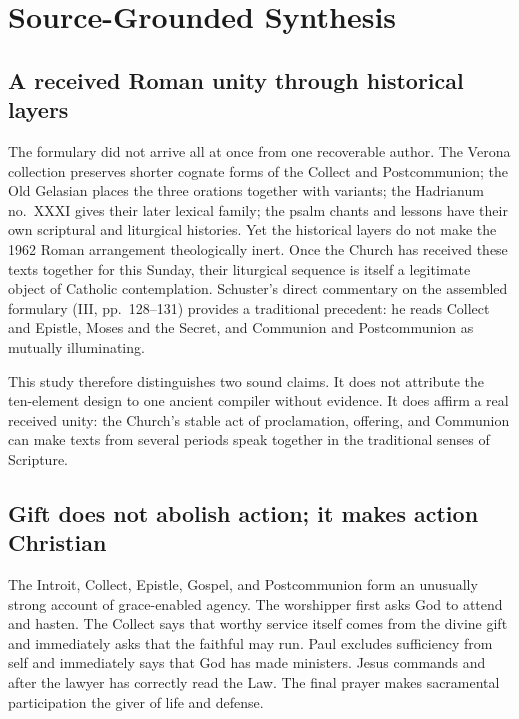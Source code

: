 \sectionguard
\section*{Source-Grounded Synthesis}

\subsection*{A received Roman unity through historical layers}

The formulary did not arrive all at once from one recoverable author. The
Verona collection preserves shorter cognate forms of the Collect and
Postcommunion; the Old Gelasian places the three orations together with
variants; the Hadrianum no.~XXXI gives their later lexical family; the psalm
chants and lessons have their own scriptural and liturgical histories. Yet the
historical layers do not make the 1962 Roman arrangement theologically inert.
Once the Church has received these texts together for this Sunday, their
liturgical sequence is itself a legitimate object of Catholic contemplation.
Schuster's direct commentary on the assembled formulary (III, pp.~128--131)
provides a traditional precedent: he reads Collect and Epistle, Moses and the
Secret, and Communion and Postcommunion as mutually illuminating.

This study therefore distinguishes two sound claims. It does not attribute the
ten-element design to one ancient compiler without evidence. It does affirm a
real received unity: the Church's stable act of proclamation, offering, and
Communion can make texts from several periods speak together in the traditional
senses of Scripture.

\subsection*{Gift does not abolish action; it makes action Christian}

The Introit, Collect, Epistle, Gospel, and Postcommunion form an unusually
strong account of grace-enabled agency. The worshipper first asks God to
attend and hasten. The Collect says that worthy service itself comes from the
divine gift and immediately asks that the faithful may run. Paul excludes
sufficiency from self and immediately says that God has made ministers. Jesus
commands  and  after the lawyer has correctly read the
Law. The final prayer makes sacramental participation the giver of life and
defense.

